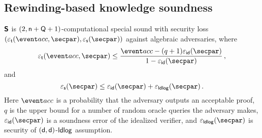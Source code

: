 \subsection{Rewinding-based knowledge soundness}
\begin{lemma}
	\label{lem:sonicprot_ss}
	$\bm{\mathsf{S}}$ is $(2, \mathsf{n} + \mathsf{Q} + 1)$-computational special sound with security loss $(\epst (\accProb, \secpar), \epss(\secpar))$ against
	algebraic adversaries, where
  \[
    \epst(\accProb, \secpar) \leq \frac{\accProb - (q + 1) \epsid (\secpar)}{1 - \epsid (\secpar)}\,,
  \]
  and
	\[
	  \epss(\secpar) \leq \epsid(\secpar) + \epsldlog(\secpar) \,.
	\]
	Here $\accProb$ is a probability that the adversary outputs an acceptable proof, $q$ is the upper bound for a number of random oracle queries the adversary makes, $\epsid(\secpar)$ is a soundness error of the idealized verifier, and $\epsldlog(\secpar)$ is security of $(\mathsf{d}, \mathsf{d})$-$\mathsf{ldlog}$ assumption.
\end{lemma}
